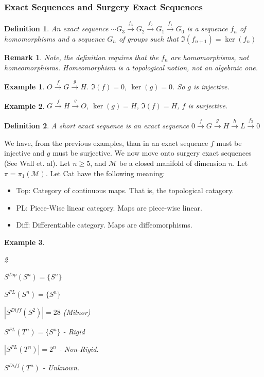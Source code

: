 \documentclass[oneside]{book}
\theoremstyle{mystyle}
\newtheorem{definition}{Definition}[section]
\newtheorem{example}{Example}[section]
\newtheorem{remark}{Remark}[section]
\begin{document}
\subsubsection{Exact Sequences and Surgery Exact Sequences}
\begin{definition}
An exact sequence $\cdots G_{3}\overset{f_{3}}{\rightarrow}G_{2}\overset{f_{2}}{\rightarrow}G_{1}\overset{f_{1}}{\rightarrow}G_{0}$ is a sequence $f_{n}$ of homomorphisms and a sequence $G_{n}$ of groups such that $\Im(f_{n+1}) = \ker(f_{n})$
\end{definition}
\begin{remark}
Note, the definition requires that the $f_{n}$ are \textit{homomorphisms}, not homeomorphisms. Homeomorphism is a topological notion, not an algebraic one.
\end{remark}
\begin{example}
$O\overset{f}{\rightarrow}G\overset{g}{\rightarrow}H$. $\Im(f) = 0$, $\ker(g) = 0$. So $g$ is injective.
\end{example}
\begin{example}
$G\overset{f}{\rightarrow}H\overset{g}{\rightarrow}O$, $\ker(g) = H$, $\Im(f) = H$, $f$ is surjective.
\end{example}
\begin{definition}
A short exact sequence is an exact sequence $0\overset{f}{\rightarrow}G\overset{g}{\rightarrow}H\overset{h}{\rightarrow}L\overset{f_{3}}{\rightarrow}0$
\end{definition}
We have, from the previous examples, than in an exact sequence $f$ must be injective and $g$ must be surjective. We now move onto surgery exact sequences (See Wall et. al). Let $n\geq 5$, and $\mathcal{M}$ be a closed manifold of dimension $n$. Let $\pi = \pi_{1}(\mathcal{M})$. Let Cat have the following meaning:
\begin{itemize}
    \item Top: Category of continuous maps. That is, the topological catagory.
    \item PL: Piece-Wise linear category. Maps are piece-wise linear.
    \item Diff: Differentiable category. Maps are diffeomorphisms.
\end{itemize}
\begin{example}
\
\begin{enumerate}
\end{enumerate}
\end{example}
\end{document}
